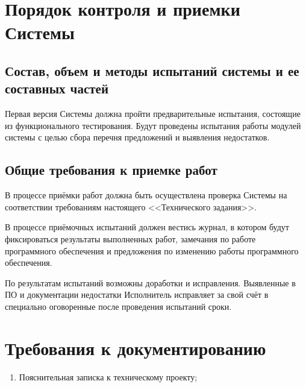 \chapter{Порядок контроля и приемки Системы}
\section{Состав, объем и методы испытаний системы и ее составных частей}
Первая версия Системы должна пройти предварительные испытания, состоящие из функционального 
тестирования. Будут проведены испытания работы модулей системы с целью сбора перечня 
предложений и выявления недостатков. 

\section{Общие требования к приемке работ}
В процессе приёмки работ должна быть осуществлена проверка Системы на соответствии требованиям 
настоящего <<Технического задания>>.

В процессе приёмочных испытаний должен вестись журнал, в котором будут фиксироваться результаты 
выполненных работ, замечания по работе программного обеспечения и предложения по изменению работы 
программного обеспечения.

По результатам испытаний возможны доработки и исправления. Выявленные в ПО и документации 
недостатки Исполнитель исправляет за свой счёт в специально оговоренные после проведения 
испытаний сроки.

\chapter{Требования к документированию}
\begin{enumerate}
    \item Пояснительная записка к техническому проекту;
\end{enumerate}

\stopcontents[sections]